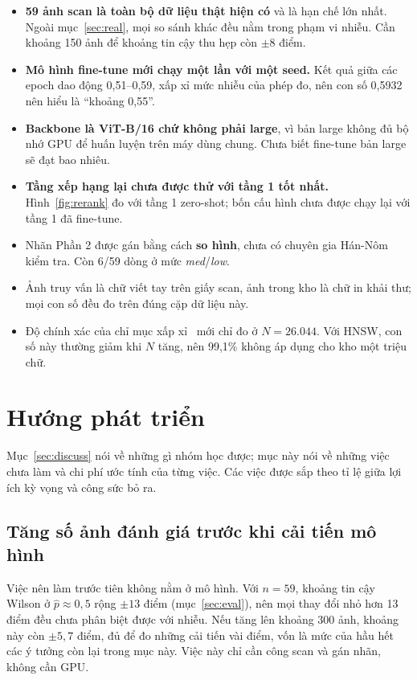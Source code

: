 \documentclass[conference,a4paper]{IEEEtran}
\begin{document}
\begin{itemize}
  \item \textbf{59 ảnh scan là toàn bộ dữ liệu thật hiện có} và là hạn chế lớn nhất. Ngoài
        mục~\ref{sec:real}, mọi so sánh khác đều nằm trong phạm vi nhiễu. Cần khoảng 150 ảnh để khoảng
        tin cậy thu hẹp còn $\pm8$ điểm.
  \item \textbf{Mô hình fine-tune mới chạy một lần với một seed.} Kết quả giữa các epoch dao động
        0,51--0,59, xấp xỉ mức nhiễu của phép đo, nên con số 0,5932 nên hiểu là ``khoảng 0,55''.
  \item \textbf{Backbone là ViT-B/16 chứ không phải large}, vì bản large không đủ bộ nhớ GPU để huấn
        luyện trên máy dùng chung. Chưa biết fine-tune bản large sẽ đạt bao nhiêu.
  \item \textbf{Tầng xếp hạng lại chưa được thử với tầng 1 tốt nhất.} Hình~\ref{fig:rerank} đo với
        tầng 1 zero-shot; bốn cấu hình chưa được chạy lại với tầng 1 đã fine-tune.
  \item Nhãn Phần 2 được gán bằng cách \textbf{so hình}, chưa có chuyên gia Hán-Nôm kiểm tra. Còn
        6/59 dòng ở mức \emph{med}/\emph{low}.
  \item Ảnh truy vấn là chữ viết tay trên giấy scan, ảnh trong kho là chữ in khải thư; mọi con số đều
        đo trên đúng cặp dữ liệu này.
  \item Độ chính xác của chỉ mục xấp xỉ~\cite{hnsw} mới chỉ đo ở $N = 26.044$. Với HNSW, con số này
        thường giảm khi $N$ tăng, nên 99,1\% không áp dụng cho kho một triệu chữ.
\end{itemize}

\section{Hướng phát triển}
\label{sec:future}

Mục~\ref{sec:discuss} nói về những gì nhóm học được; mục này nói về những việc chưa làm và chi phí ước
tính của từng việc. Các việc được sắp theo tỉ lệ giữa lợi ích kỳ vọng và công sức bỏ ra.

\subsection{Tăng số ảnh đánh giá trước khi cải tiến mô hình}

Việc nên làm trước tiên không nằm ở mô hình. Với $n = 59$, khoảng tin cậy Wilson ở $\hat{p} \approx
0{,}5$ rộng $\pm13$ điểm (mục~\ref{sec:eval}), nên mọi thay đổi nhỏ hơn 13 điểm đều chưa phân biệt
được với nhiễu. Nếu tăng lên khoảng 300 ảnh, khoảng này còn $\pm5{,}7$ điểm, đủ để đo những cải tiến
vài điểm, vốn là mức của hầu hết các ý tưởng còn lại trong mục này. Việc này chỉ cần công scan và gán
nhãn, không cần GPU.
\end{document}
